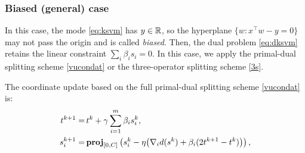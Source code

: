 \subsubsection*{Biased (general) case} In this case, the mode \eqref{eq:ksvm} has $y\in\mathbb{R}$, so the hyperplane $\{w:x^\top w-y=0\}$ may not pass the origin and is called \emph{biased}. Then,  the dual problem \eqref{eq:dksvm} retains the linear constraint $\sum_i \beta_i s_i=0$. In this case, we apply the primal-dual splitting scheme \eqref{vucondat} or the three-operator splitting scheme \eqref{3s}.

The coordinate update based on the full primal-dual splitting scheme \eqref{vucondat} is:
\begin{subequations}\label{eq:pd-svm}
\begin{align}
t^{k+1}=&\,t^k+\gamma\sum_{i=1}^m \beta_i s_i^k,\label{eq:pd-svm-t}\\
s_i^{k+1}=&\,\prj_{[0,C]}\left(s_i^k-\eta\big(\nabla_i d(s^k)+\beta_i(2t^{k+1}-t^k)\big)\right), \label{eq:pd-svm-s}
\end{align}
\end{subequations}

